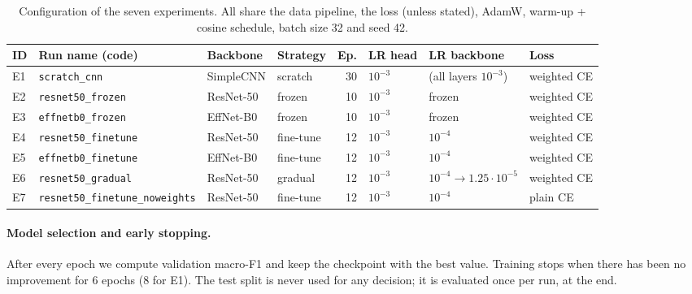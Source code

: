 \begin{table}[H]
\centering
\caption{Configuration of the seven experiments. All share the data pipeline, the loss (unless stated),
AdamW, warm-up + cosine schedule, batch size 32 and seed 42.}
\label{tab:runs}
\footnotesize
\setlength{\tabcolsep}{4pt}
\begin{tabular}{llllrlll}
\toprule
ID & Run name (code) & Backbone & Strategy & Ep. & LR head & LR backbone & Loss \\
\midrule
E1 & \texttt{scratch\_cnn} & SimpleCNN & scratch & 30 & $10^{-3}$ & (all layers $10^{-3}$) & weighted CE \\
E2 & \texttt{resnet50\_frozen} & ResNet-50 & frozen & 10 & $10^{-3}$ & frozen & weighted CE \\
E3 & \texttt{effnetb0\_frozen} & EffNet-B0 & frozen & 10 & $10^{-3}$ & frozen & weighted CE \\
E4 & \texttt{resnet50\_finetune} & ResNet-50 & fine-tune & 12 & $10^{-3}$ & $10^{-4}$ & weighted CE \\
E5 & \texttt{effnetb0\_finetune} & EffNet-B0 & fine-tune & 12 & $10^{-3}$ & $10^{-4}$ & weighted CE \\
E6 & \texttt{resnet50\_gradual} & ResNet-50 & gradual & 12 & $10^{-3}$ & $10^{-4}\!\to\!1.25{\cdot}10^{-5}$ & weighted CE \\
E7 & \texttt{resnet50\_finetune\_noweights} & ResNet-50 & fine-tune & 12 & $10^{-3}$ & $10^{-4}$ & plain CE \\
\bottomrule
\end{tabular}
\end{table}

\paragraph{Model selection and early stopping.} After every epoch we compute validation macro-F1 and keep the
checkpoint with the best value. Training stops when there has been no improvement for 6 epochs (8 for E1).
The test split is never used for any decision; it is evaluated once per run, at the end.

